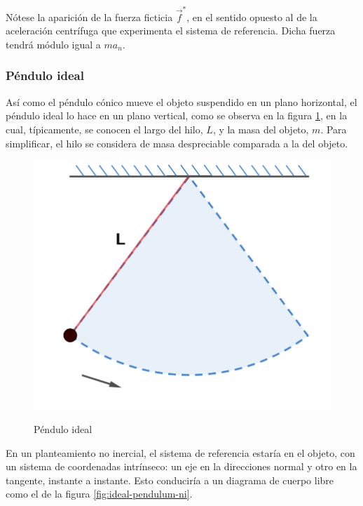 \documentclass{article}
\begin{document}
Nótese la aparición de la fuerza ficticia $\vec{f}^{*}$, en el sentido opuesto al de la aceleración centrífuga que experimenta el sistema de referencia. Dicha fuerza tendrá módulo igual a $m a_n$.

\subsubsection{Péndulo ideal}

Así como el péndulo cónico mueve el objeto suspendido en un plano horizontal, el péndulo ideal lo hace en un plano vertical, como se observa en la figura \ref{fig:ideal-pendulum}, en la cual, típicamente, se conocen el largo del hilo, $L$, y la masa del objeto, $m$. Para simplificar, el hilo se considera de masa despreciable comparada a la del objeto.

\begin{figure}[ht]
\centering
\caption{Péndulo ideal}
\includegraphics[scale=0.7]{../../common/img/62.01/theory/13-dynamics-ideal-pendulum.png}
\label{fig:ideal-pendulum}
\end{figure}

En un planteamiento no inercial, el sistema de referencia estaría en el objeto, con un sistema de coordenadas intrínseco: un eje en la direcciones normal y otro en la tangente, instante a instante. Esto conduciría a un diagrama de cuerpo libre como el de la figura \ref{fig:ideal-pendulum-ni}.
\end{document}
